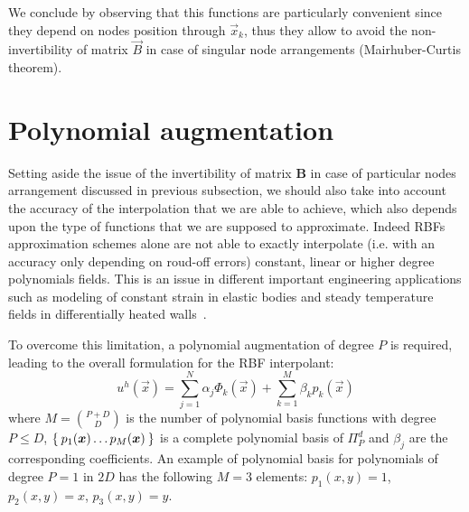 We conclude by observing that this functions are particularly convenient since they depend on nodes position through $\vec{x}_k$, thus they allow to avoid the non-invertibility of matrix $\vec{B}$ in case of singular node arrangements (Mairhuber-Curtis theorem).



\section{Polynomial augmentation}

Setting aside the issue of the invertibility of matrix $\boldsymbol{B}$ in case of particular nodes arrangement discussed in previous subsection, we should also take into account  the accuracy of the interpolation that we are able to achieve, which also depends upon the type of functions that we are supposed to approximate.
%
Indeed RBFs approximation schemes alone are not able to exactly interpolate (i.e. with an accuracy only depending on roud-off errors) constant, linear or higher degree polynomials fields. This is an issue in different important engineering applications such as modeling of constant strain in elastic bodies and steady temperature fields in differentially heated walls~\cite{Zamolo:phd_thesis}.

To overcome this limitation, a polynomial augmentation of degree $P$ is required, leading to the overall formulation for the RBF interpolant:
\begin{equation}
	\label{eq:RBF_interpolator_plus_polynomial_augmentation}
	u^h(\vec{x}) = \sum_{j=1}^{N} \alpha_j \Phi_k(\vec{x}) + \sum_{k=1}^{M} \beta_k p_k(\vec{x})
\end{equation}
where $M=\binom{P+D}{D}$ is the number of polynomial basis functions with degree $P \le D$, $\Set{p_1(\boldsymbol{x}) \dots p_M({\boldsymbol{x}})}$ is a complete polynomial basis of $\Pi_P^d$ and $\beta_j$ are the corresponding coefficients. An example of polynomial basis for polynomials of degree $P=1$ in $2D$ has the following $M=3$ elements: $p_1(x,y) = 1$, $p_2(x,y) = x$, $p_3(x,y) = y$.

